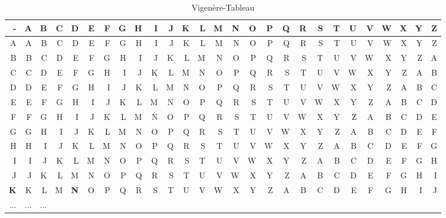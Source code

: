 \begin{refsegment}
\begin{itemize}
\begin{table}[ht]
   {
   \textmd \small
   \begin{center}
   \begin{tabular}{|@{\:}r@{\:}@{\:}|r@{\:}r@{\:}r@{\:}r@{\:}r@{\:}r@{\:}r@{\:}r@{\:}r@{\:}r@{\:}r@{\:}r@{\:}r@{\:}r@{\:}r@{\:}r@{\:}r@{\:}r@{\:}r@{\:}r@{\:}r@{\:}r@{\:}r@{\:}r@{\:}r@{\:}r@{\:}|}
   \hline
	- & A & B & C & {\bf D} & E & F & G & H & I & J & K & L & M & N & O & P & Q & R & S & T & U & V & W & X & Y & Z\\
   \hline
	A & A & B & C & D & E & F & G & H & I & J & K & L & M & N & O & P & Q & R & S & T & U & V & W & X & Y & Z\\
	B & B & C & D & E & F & G & H & I & J & K & L & M & N & O & P & Q & R & S & T & U & V & W & X & Y & Z & A\\
	C & C & D & E & F & G & H & I & J & K & L & M & N & O & P & Q & R & S & T & U & V & W & X & Y & Z & A & B\\
	D & D & E & F & G & H & I & J & K & L & M & N & O & P & Q & R & S & T & U & V & W & X & Y & Z & A & B & C\\
	E & E & F & G & H & I & J & K & L & M & N & O & P & Q & R & S & T & U & V & W & X & Y & Z & A & B & C & D\\
	F & F & G & H & I & J & K & L & M & N & O & P & Q & R & S & T & U & V & W & X & Y & Z & A & B & C & D & E\\
	G & G & H & I & J & K & L & M & N & O & P & Q & R & S & T & U & V & W & X & Y & Z & A & B & C & D & E & F\\
	H & H & I & J & K & L & M & N & O & P & Q & R & S & T & U & V & W & X & Y & Z & A & B & C & D & E & F & G\\
	I & I & J & K & L & M & N & O & P & Q & R & S & T & U & V & W & X & Y & Z & A & B & C & D & E & F & G & H\\
	J & J & K & L & M & N & O & P & Q & R & S & T & U & V & W & X & Y & Z & A & B & C & D & E & F & G & H & I\\
	{\bf K} & K & L & M & {\bf N} & O & P & Q & R & S & T & U & V & W & X & Y & Z & A & B & C & D & E & F & G & H & I & J\\
	... & ... & ... &   &   &   &   &   &   &   &   &   &   &   &   &   &   &   &   &   &   &   &   &   &   &   &  \\
   \hline
   \end{tabular}
   \caption{Vigen\`ere-Tableau}
   \label{Vigenere-table-reference}
   \end{center}
   }

   \end{table}



\end{itemize}
\end{refsegment}
